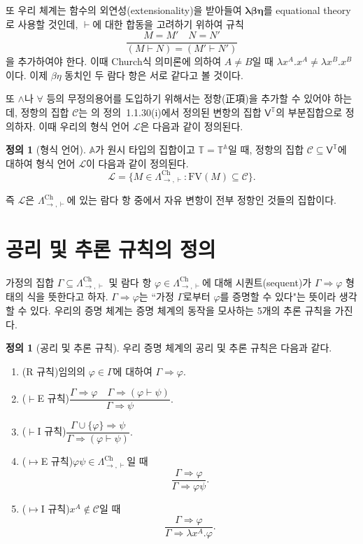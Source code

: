 \documentclass[10pt,twocolumn]{article}
\theoremstyle{definition}
\newtheorem{definition}[theorem]{정의}
\newcommand{\Lchh}{\Lambda_{\to,\vdash}^{\text{Ch}}}
\begin{document}
또 우리 체계는 함수의 외연성(extensionality)을 받아들여 $\bm{\lambda\beta\eta}$를 equational theory로 사용할 것인데, $\vdash$에 대한 합동을 고려하기 위하여 규칙
$$\dfrac{M=M'\quad N=N'}{(M\vdash N)=(M'\vdash N')}$$
을 추가하여야 한다. 이때 Church식 의미론에 의하여 $A\ne B$일 때 $\lambda x^A.x^A\ne\lambda x^B.x^B$이다. 이제 $\beta\eta$ 동치인 두 람다 항은 서로 같다고 볼 것이다.

또 $\land$나 $\forall$ 등의 무정의용어를 도입하기 위해서는 정항(正項)을 추가할 수 있어야 하는데, 정항의 집합 $\mathcal C$는 \cite{luswt}의 정의~1.1.30(i)에서 정의된 변항의 집합 $\mathsf V^{\mathds T}$의 부분집합으로 정의하자. 이때 우리의 형식 언어 $\mathcal L$은 다음과 같이 정의된다.

\begin{definition}[형식 언어]
	$\mathbb A$가 원시 타입의 집합이고 $\mathds T = \mathds T^{\mathbb A}$일 때, 정항의 집합 $\mathcal C\subseteq \mathsf V^{\mathds T}$에 대하여 형식 언어 $\mathcal L$이 다음과 같이 정의된다.
	$$\mathcal L = \{M\in\Lchh: \mathrm{FV}(M)\subseteq\mathcal C\}.$$
\end{definition}

즉 $\mathcal L$은 $\Lchh$에 있는 람다 항 중에서 자유 변항이 전부 정항인 것들의 집합이다.

\section{공리 및 추론 규칙의 정의}

가정의 집합 $\Gamma\subseteq\Lchh$ 및 람다 항 $\varphi\in\Lchh$에 대해 시퀀트(sequent)가 $\Gamma\Rightarrow\varphi$ 형태의 식을 뜻한다고 하자. $\Gamma\Rightarrow\varphi$는 ``가정 $\Gamma$로부터 $\varphi$를 증명할 수 있다"는 뜻이라 생각할 수 있다. 우리의 증명 체계는 증명 체계의 동작을 모사하는 5개의 추론 규칙을 가진다.

\begin{definition}[공리 및 추론 규칙]
	우리 증명 체계의 공리 및 추론 규칙은 다음과 같다.
	
	\begin{enumerate}
		\item (R 규칙)\quad 임의의 $\varphi\in\Gamma$에 대하여 $\Gamma\Rightarrow\varphi.$
		\item ($\vdash$E 규칙)\quad $\dfrac{\Gamma\Rightarrow\varphi\quad\Gamma\Rightarrow(\varphi\vdash\psi)}{\Gamma\Rightarrow\psi}.$
		\item ($\vdash$I 규칙)\quad $\dfrac{\Gamma\cup\{\varphi\}\Rightarrow\psi}{\Gamma\Rightarrow(\varphi\vdash\psi)}.$
		\item ($\mapsto$E 규칙)\quad $\varphi\psi\in\Lchh$일 때 $$\dfrac{\Gamma\Rightarrow\varphi}{\Gamma\Rightarrow\varphi\psi}.$$
		\item ($\mapsto$I 규칙)\quad $x^A\notin\mathcal C$일 때 $$\dfrac{\Gamma\Rightarrow\varphi}{\Gamma\Rightarrow\lambda x^A.\varphi}.$$
	\end{enumerate}
\end{definition}
\end{document}

